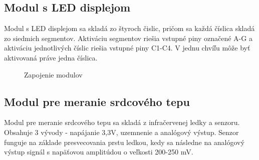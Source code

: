 \documentclass[11pt,a4paper]{article}
\begin{document}
	\subsection{Modul s LED displejom}
	Modul s LED displejom sa skladá zo štyroch čislic, pričom sa každá číslica skladá zo siedmich segmentov.
	Aktiváciu segmentov riešia vstupné piny označené A-G a aktiváciu jednotlivých číslic riešia vstupné piny C1-C4. 
	V jednu chvíľu môže byť aktivovaná práve jedna číslica.
	\begin{figure}[h] 
		\centering
		\caption{Zapojenie modulov}
		\label{con}
	\end{figure}	

	\subsection{Modul pre meranie srdcového tepu}
	Modul pre meranie srdcového tepu sa skladá z infračervenej ledky a senzoru. 
	Obsahuje 3 vývody - napájanie 3,3V, uzemnenie a analógový výstup.
	Senzor funguje na základe presvecovania prstu ledkou, kedy sa následne na analógový výstup signál s napäťovou amplitúdou o veľkosti 200-250 mV.\\
\end{document}
